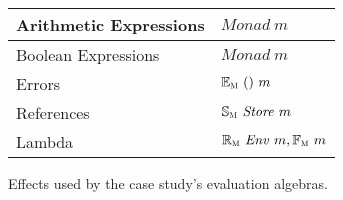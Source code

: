\begin{figure}[t]
  \begin{center}
  \begin{tabular}{| l | l |}
    \hline
    Arithmetic Expressions & $\mathit{Monad}~m$ \\
    \hline
    Boolean Expressions & $\mathit{Monad}~m$\\
    \hline
    Errors & $\mathbb{E}_{\scalebox{0.6}{M}}~()~m$ \\
    \hline
    References & $\mathbb{S}_{\scalebox{0.6}{M}}~\mathit{Store}~m$ \\
    \hline
    Lambda & $\mathbb{R}_{\scalebox{0.6}{M}}~\mathit{Env}~m, \mathbb{F}_{\scalebox{0.6}{M}}~m$\\
    \hline
    \end{tabular}
  \end{center}
  \caption{Effects used by the case study's evaluation algebras.}
\vspace{-.3cm}
  \label{fig:FeatureEffects}
\end{figure}
